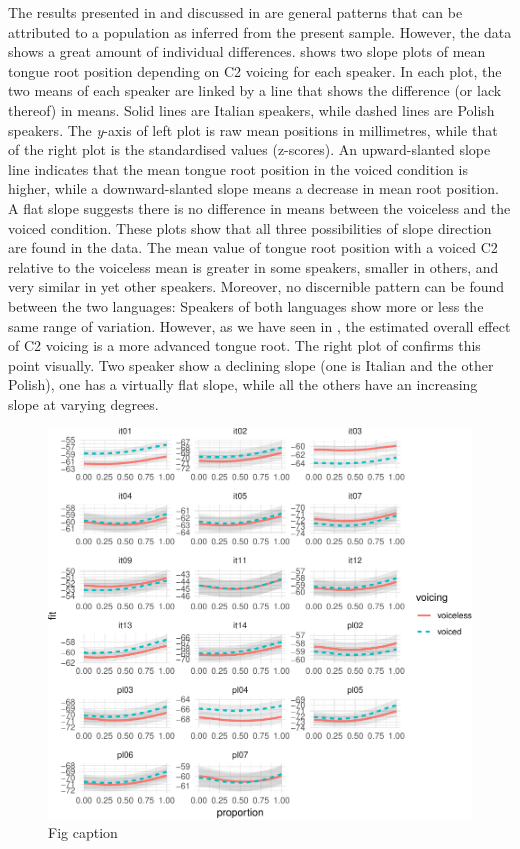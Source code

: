 \documentclass[12pt,]{article}
\begin{document}
The results presented in  and discussed in
 are general patterns that can be attributed to a
population as inferred from the present sample. However, the data shows
a great amount of individual differences. 
shows two slope plots of mean tongue root position depending on C2
voicing for each speaker. In each plot, the two means of each speaker
are linked by a line that shows the difference (or lack thereof) in
means. Solid lines are Italian speakers, while dashed lines are Polish
speakers. The \emph{y}-axis of left plot is raw mean positions in
millimetres, while that of the right plot is the standardised values
(z-scores). An upward-slanted slope line indicates that the mean tongue
root position in the voiced condition is higher, while a
downward-slanted slope means a decrease in mean root position. A flat
slope suggests there is no difference in means between the voiceless and
the voiced condition. These plots show that all three possibilities of
slope direction are found in the data. The mean value of tongue root
position with a voiced C2 relative to the voiceless mean is greater in
some speakers, smaller in others, and very similar in yet other
speakers. Moreover, no discernible pattern can be found between the two
languages: Speakers of both languages show more or less the same range
of variation. However, as we have seen in , the
estimated overall effect of C2 voicing is a more advanced tongue root.
The right plot of  confirms this point
visually. Two speaker show a declining slope (one is Italian and the
other Polish), one has a virtually flat slope, while all the others have
an increasing slope at varying degrees.

\begin{figure}
\includegraphics[width=\linewidth]{2018-tra_files/figure-latex/tra-gam-s-ar-plot-1} \caption{Fig caption}\label{f:tra-gam-s-ar-plot}
\end{figure}
\end{document}
